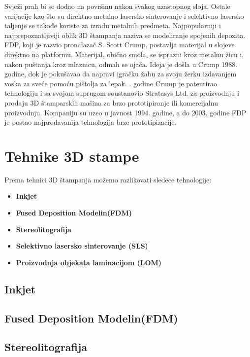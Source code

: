 \documentclass[a4paper]{article}
\begin{document}
{\bigbreak Svježi prah bi se dodao na površinu nakon svakog uzastopnog sloja. Ostale varijacije kao što su direktno metalno lasersko sinterovanje i selektivno lasersko taljenje se takođe koriste za izradu metalnih predmeta. 
\bigbreak Najpopularniji i najprepoznatljiviji oblik 3D štampanja naziva se modeliranje spojenih depozita. FDP, koji je razvio pronalazač S. Scott Crump, postavlja materijal u slojeve direktno na platformu. Materijal, obično smola, se isprazni kroz metalnu žicu i, nakon puštanja kroz mlaznicu, odmah se ojača. Ideja je došla u Crump 1988. godine, dok je pokušavao da napravi igračku žabu za svoju žerku izdavanjem voska za sveće pomoću pištolja za lepak. 
. godine Crump je patentirao tehnologiju i sa svojom suprugom soustanovio Stratasys Ltd. za proizvodnju i prodaju 3D štamparskih mašina za brzo prototipiranje ili komercijalnu proizvodnju. 
Kompaniju su uzeo u javnost 1994. godine, a do 2003. godine FDP je postao najprodavanija tehnologija brze prototipizacije. 

\section{Tehnike 3D stampe}
\label{sec:naslov1}
Prema tehnici 3D štampanja možemo razlikovati sledece tehnologije:
\begin{itemize}
\item \textbf{Inkjet}
\item \textbf{Fused Deposition Modelin(FDM)}
\item \textbf{Stereolitografija}
\item \textbf{Selektivno lasersko sinterovanje (SLS)}
\item \textbf{Proizvodnja objekata laminacijom (LOM)}
\end{itemize} 



 


\subsection{Inkjet}
\label{subsec:podnaslov1}



\subsection{Fused Deposition Modelin(FDM)}
\label{subsec:podnaslov2}

 
\subsection{Stereolitografija}
\label{subsec:podnaslov3}


}
\end{document}
